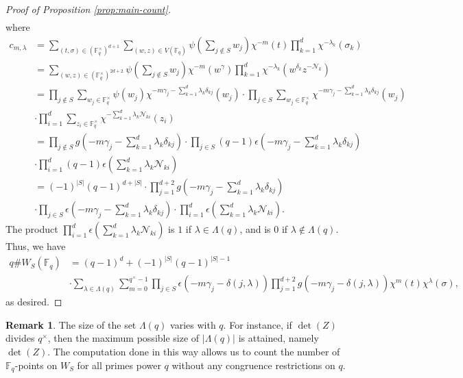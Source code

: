 \documentclass[11pt, reqno]{amsart}
\theoremstyle{plain}
\theoremstyle{definition}
\newtheorem{rem}[theo]{Remark}
\newcommand{\F}{\mathbb{F}}
\begin{document}
\begin{proof}[Proof of Proposition \ref{prop:main-count}]
\begin{align*}
\end{align*}
   where 
\begingroup
\allowdisplaybreaks
\begin{align*}
    c_{m,\lambda}  &= \sum_{(t,\sigma) \in \left(\F_q^\times\right)^{d+1}} \sum_{(w,z) \in V(\F_q)} \psi \left(\sum_{j\notin S} w_j\right) \chi^{-m}(t) \prod_{k=1}^d \chi^{-\lambda_k} (\sigma_k) \\
    &=  \sum_{(w,z) \in \left(\F_q^\times\right)^{2d+2} } \psi \left(\sum_{j\notin S} w_j\right) \chi^{-m}(w^\gamma) \prod_{k=1}^d \chi^{-\lambda_k}\left( w^{\delta_k}z^{-\mathcal{N}_k}\right) \\
    &=  \prod_{j \notin S}  \sum_{w_j \in \F_q^\times} \psi(w_j) \chi^{-m \gamma_j -\sum_{k=1}^d \lambda_k\delta_{kj}}(w_j) \cdot \prod_{j \in S}  \sum_{w_j \in \F_q^\times} \chi^{-m \gamma_j -\sum_{k=1}^d \lambda_k\delta_{kj}}(w_j) \\
    &\cdot  \prod_{i=1}^d \sum_{z_i \in \F_q^\times} \chi^{ - \sum_{k=1}^d \lambda_k\mathcal{N}_{ki}}(z_i) \\
    &=  \prod_{j \notin S}   g\left(-m\gamma_j -  \sum_{k=1}^d \lambda_k \delta_{kj}\right) \cdot \prod_{j\in S} (q-1)\epsilon\left( -m \gamma_j -\sum_{k=1}^d \lambda_k\delta_{kj} \right) \\
    &\cdot  \prod_{i=1}^d (q-1) \epsilon \left( \sum_{k=1}^d \lambda_k\mathcal{N}_{ki} \right) \\
    &= (-1)^{|S|} (q-1)^{d+|S|}\cdot \prod_{j=1}^{d+2} g\left(-m\gamma_j -  \sum_{k=1}^d \lambda_k \delta_{kj}\right)   \\
    &\cdot\prod_{j\in S} \epsilon\left( -m \gamma_j -\sum_{k=1}^d \lambda_k\delta_{kj} \right) \cdot \prod_{i=1}^d \epsilon \left( \sum_{k=1}^d \lambda_k\mathcal{N}_{ki} \right).
\end{align*}
\endgroup
The product $\prod_{i=1}^d \epsilon \left( \sum_{k=1}^d \lambda_k\mathcal{N}_{ki} \right)$ is $1$ if $\lambda \in \Lambda(q)$, and is $0$ if $\lambda \notin \Lambda(q)$.  Thus, we have 
\begin{align*}
    q \# W_{S} (\mathbb{F}_q) &= (q-1)^{d} + (-1)^{|S|}(q-1)^{|S|-1}\\
    &\cdot\sum_{\lambda \in \Lambda(q)}  \sum_{m=0}^{q^\times -1}\prod_{j\in S} \epsilon\left( -m \gamma_j -\delta(j,\lambda) \right)\prod_{j=1}^{d+2}g\left(-m\gamma_j - \delta(j,\lambda)\right) \chi^{m}(t) \chi^{\lambda}(\sigma),
\end{align*}
as desired.
\end{proof}

\begin{rem}
The size of the set $\Lambda(q)$ varies with $q$. For instance, if  $\det(Z)$ divides $q^\times$, then the maximum possible size of $|\Lambda(q)|$ is attained, namely $\det(Z)$. The computation done in this way allows us to count the number of $\F_q$-points on $W_S$ for all primes power $q$ without any congruence restrictions on $q.$
\end{rem}
\end{document}
